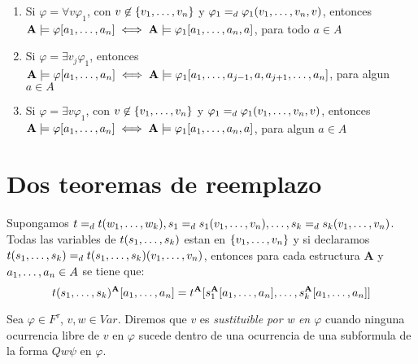 \begin{lemma}
\begin{enumerate}
    \item Si $\varphi = \forall v \varphi_1$, con $v\not\in\{v_{1}, \dots, v_{n}\}$ y $\varphi_1 =_d \varphi_1(v_{1}, \dots, v_{n},v)$, entonces\\ $\mathbf{A}\models\varphi[a_{1}, \dots, a_{n}] \iff \mathbf{A}\models\varphi_1[a_{1}, \dots, a_{n},a]$, para todo $a \in A$
    \item Si $\varphi = \exists v_j \varphi_1$, entonces \\$\mathbf{A}\models\varphi[a_{1}, \dots, a_{n}] \iff \mathbf{A}\models\varphi_1[a_{1}, \dots, a_{j-1},a,a_{j+1}, \dots, a_{n}]$, para algun $a \in A$
    \item Si $\varphi = \exists v \varphi_1$, con $v\not\in\{v_{1}, \dots, v_{n}\}$ y $\varphi_1 =_d \varphi_1(v_{1}, \dots, v_{n},v)$, entonces\\ $\mathbf{A}\models\varphi[a_{1}, \dots, a_{n}] \iff \mathbf{A}\models\varphi_1[a_{1}, \dots, a_{n},a]$, para algun $a \in A$
  \end{enumerate}
\end{lemma}

\noproof

\section*{Dos teoremas de reemplazo}

\begin{theorem}
  $ $\\
  Supongamos $t =_d t(w_{1}, \dots, w_{k}), s_1 =_d s_1(v_{1}, \dots, v_{n}), \dots, s_k =_d s_k(v_{1}, \dots, v_{n})$.
  Todas las variables de $t(s_{1}, \dots, s_{k})$ estan en $\{v_{1}, \dots, v_{n}\}$ y si declaramos
  $t(s_{1}, \dots, s_{k}) =_d t(s_{1}, \dots, s_{k})(v_{1}, \dots, v_{n})$, entonces para cada 
  estructura $\mathbf{A}$ y $a_{1}, \dots, a_{n} \in A$ se tiene que:
  $$
  t(s_{1}, \dots, s_{k})^\mathbf{A}[a_{1}, \dots, a_{n}] = t^\mathbf{A}[s_1^\mathbf{A}[a_{1}, \dots, a_{n}], \dots, s_k^\mathbf{A}[a_{1}, \dots, a_{n}]]
  $$
\end{theorem}

\noproof
\begin{definition}
  Sea $\varphi \in F^\tau$, $v, w \in Var$. Diremos que $v$ es \emph{sustituible por w en $\varphi$} cuando ninguna ocurrencia libre de $v$ en $\varphi$ sucede dentro de una 
  ocurrencia de una subformula de la forma $Q w \psi$ en $\varphi$.
\end{definition}


